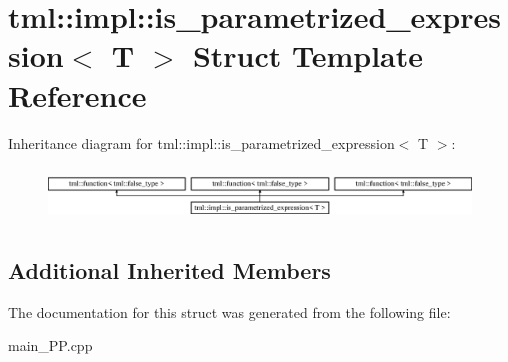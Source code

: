\hypertarget{structtml_1_1impl_1_1is__parametrized__expression}{\section{tml\+:\+:impl\+:\+:is\+\_\+parametrized\+\_\+expression$<$ T $>$ Struct Template Reference}
\label{structtml_1_1impl_1_1is__parametrized__expression}
}
Inheritance diagram for tml\+:\+:impl\+:\+:is\+\_\+parametrized\+\_\+expression$<$ T $>$\+:\begin{figure}[H]
\begin{center}
\leavevmode
\includegraphics[height=1.452659cm]{structtml_1_1impl_1_1is__parametrized__expression}
\end{center}
\end{figure}
\subsection*{Additional Inherited Members}


The documentation for this struct was generated from the following file\+:\begin{DoxyCompactItemize}
\item 
main\+\_\+\+P\+P.\+cpp\end{DoxyCompactItemize}
